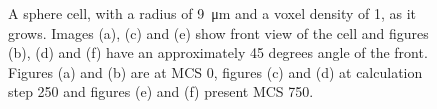 \begin{figure}[ht]
\begin{center}
{	}
	\end{center}
	\begin{center}
	\end{center}
	\caption[Growth of a sphere cell with a radius of 9]{\label{img:GrowthSphereCellRadius9}A sphere cell, with a radius of \SI{9}{\micro\metre} and a voxel density of 1, as it grows. Images (a), (c) and (e) show front view of the cell and figures (b), (d) and (f) have an approximately 45 degrees angle of the front. Figures (a) and (b) are at \ac{MCS} 0, figures (c) and (d) at calculation step 250 and figures (e) and (f) present \ac{MCS} 750.}
\end{figure}


